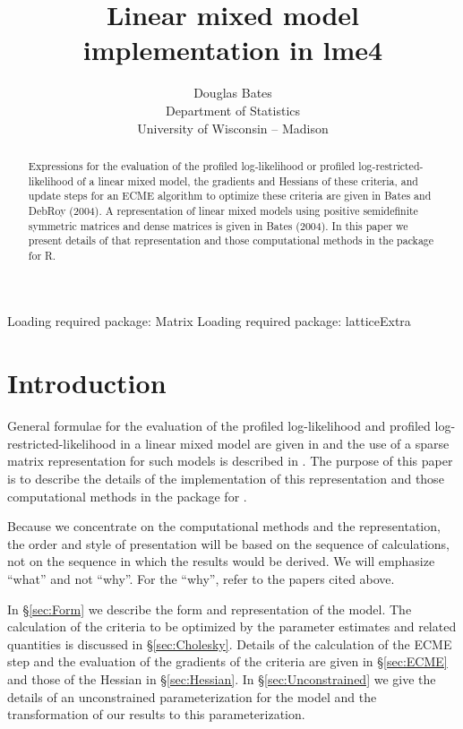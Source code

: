 \documentclass[12pt]{article}
\begin{document}
\title{Linear mixed model implementation in lme4}
\author{Douglas Bates\\Department of Statistics\\University of
  Wisconsin -- Madison\\}
\maketitle
\begin{abstract}
  Expressions for the evaluation of the profiled log-likelihood or
  profiled log-restricted-likelihood of a linear mixed model, the
  gradients and Hessians of these criteria, and update steps for an
  ECME algorithm to optimize these criteria are given in Bates and
  DebRoy (2004).  A representation of linear mixed models using
  positive semidefinite symmetric matrices and dense matrices is given
  in Bates (2004).  In this paper we present details of that
  representation and those computational methods in the 
  package for R.
\end{abstract}

\begin{Schunk}
\begin{Soutput}
Loading required package: Matrix 
Loading required package: latticeExtra 
\end{Soutput}
\end{Schunk}
\section{Introduction}
\label{sec:Intro}

General formulae for the evaluation of the profiled log-likelihood and
profiled log-restricted-likelihood in a linear mixed model are given
in \citet{bate:debr:2004} and the use of a sparse matrix
representation for such models is described in \citet{bate:2004}.  The
purpose of this paper is to describe the details of the implementation
of this representation and those computational methods in the 
package for \RR{}.

Because we concentrate on the computational methods and the
representation, the order and style of presentation will be based on
the sequence of calculations, not on the sequence in which the results
would be derived.  We will emphasize ``what'' and not ``why''.  For
the ``why'', refer to the papers cited above.

In \S\ref{sec:Form} we describe the form and representation of the
model.  The calculation of the criteria to be optimized by the
parameter estimates and related quantities is discussed in
\S\ref{sec:Cholesky}.  Details of the calculation of the ECME step and the
evaluation of the gradients of the criteria are given in
\S\ref{sec:ECME} and those of the Hessian in \S\ref{sec:Hessian}.  In
\S\ref{sec:Unconstrained} we give the details of an unconstrained
parameterization for the model and the transformation of our
results to this parameterization.
\end{document}
